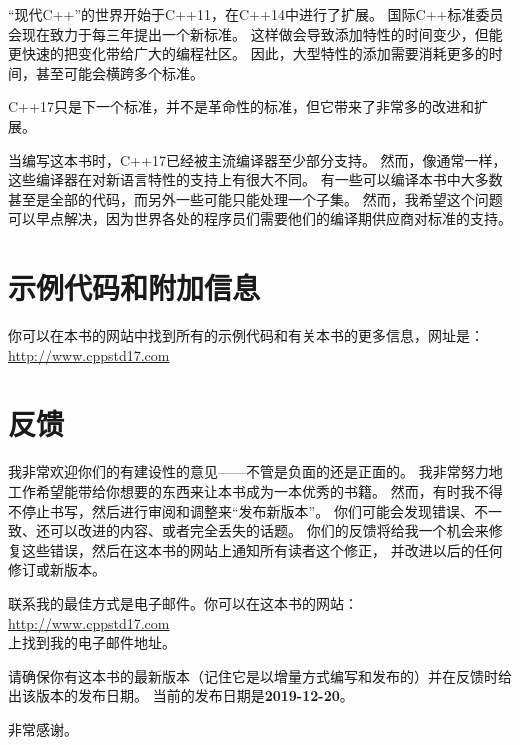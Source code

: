 “现代C++”的世界开始于C++11，在C++14中进行了扩展。
国际C++标准委员会现在致力于每三年提出一个新标准。
这样做会导致添加特性的时间变少，但能更快速的把变化带给广大的编程社区。
因此，大型特性的添加需要消耗更多的时间，甚至可能会横跨多个标准。

C++17只是下一个标准，并不是革命性的标准，但它带来了非常多的改进和扩展。

当编写这本书时，C++17已经被主流编译器至少部分支持。
然而，像通常一样，这些编译器在对新语言特性的支持上有很大不同。
有一些可以编译本书中大多数甚至是全部的代码，而另外一些可能只能处理一个子集。
然而，我希望这个问题可以早点解决，因为世界各处的程序员们需要他们的编译期供应商对标准的支持。

\section{示例代码和附加信息}
你可以在本书的网站中找到所有的示例代码和有关本书的更多信息，网址是：\\
\hspace*{2em}\url{http://www.cppstd17.com}

\section{反馈}
我非常欢迎你们的有建设性的意见——不管是负面的还是正面的。
我非常努力地工作希望能带给你想要的东西来让本书成为一本优秀的书籍。
然而，有时我不得不停止书写，然后进行审阅和调整来“发布新版本”。
你们可能会发现错误、不一致、还可以改进的内容、或者完全丢失的话题。
你们的反馈将给我一个机会来修复这些错误，然后在这本书的网站上通知所有读者这个修正，
并改进以后的任何修订或新版本。

联系我的最佳方式是电子邮件。你可以在这本书的网站：\\
\hspace*{2em}\url{http://www.cppstd17.com}\\
上找到我的电子邮件地址。

请确保你有这本书的最新版本（记住它是以增量方式编写和发布的）并在反馈时给出该版本的发布日期。
当前的发布日期是\textbf{2019-12-20}。

非常感谢。
